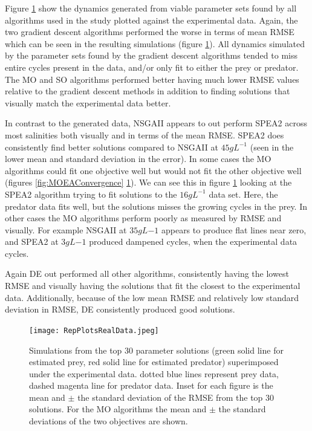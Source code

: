 \documentclass[twocolumn, 9pt]{article}
\begin{document}
\indent{} Figure \ref{fig:RepRealData} show the dynamics generated from viable parameter sets found by all algorithms used in the study plotted against the experimental data. Again, the two gradient descent algorithms performed the worse in terms of mean RMSE which can be seen in the resulting simulations (figure \ref{fig:RepRealData}). All dynamics simulated by the parameter sets found by the gradient descent algorithms tended to miss entire cycles present in the data, and/or only fit to either the prey or predator. The MO and SO algorithms performed better having much lower RMSE values relative to the gradient descent methods in addition to finding solutions that visually match the experimental data better.

\indent{} In contrast to the generated data, NSGAII appears to out perform SPEA2 across most salinities both visually and in terms of the mean RMSE. SPEA2 does consistently find better solutions compared to NSGAII at $45 gL^{-1}$ (seen in the lower mean and standard deviation in the error). In some cases the MO algorithms could fit one objective well but would not fit the other objective well (figures \ref{fig:MOEAConvergence} \ref{fig:RepRealData}). We can see this in figure \ref{fig:RepRealData} looking at the SPEA2 algorithm trying to fit solutions to the $16 gL^{-1}$ data set. Here, the predator data fits well, but the solutions misses the growing cycles in the prey. In other cases the MO algorithms perform poorly as measured by RMSE and visually. For example NSGAII at $35 gL{-1}$ appears to produce flat lines near zero, and SPEA2 at $3 gL{-1}$ produced dampened cycles, when the experimental data cycles.

\indent{} Again DE out performed all other algorithms, consistently having the lowest RMSE and visually having the solutions that fit the closest to the experimental data. Additionally, because of the low mean RMSE and relatively low standard deviation in RMSE, DE consistently produced good solutions.  

\begin{figure}[t]
    \centering
    \texttt{[image: RepPlotsRealData.jpeg]}
    \caption{Simulations from the top 30 parameter solutions (green solid line for estimated prey, red solid line for estimated predator) superimposed under the experimental data. dotted blue lines represent prey data, dashed magenta line for predator data. Inset for each figure is the mean and $\pm$ the standard deviation of the RMSE from the top 30 solutions. For the MO algorithms the mean and $\pm$ the standard deviations of the two objectives are shown.}
    \label{fig:RepRealData}
\end{figure}
\end{document}
